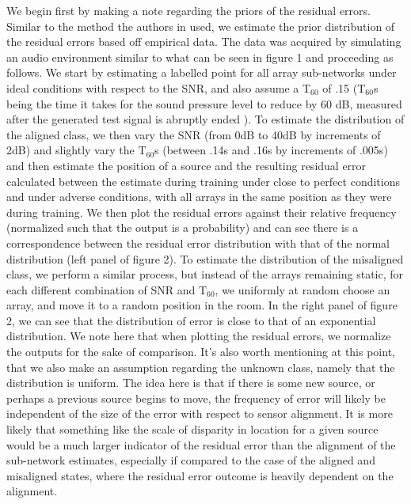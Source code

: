 \documentclass{article}
\begin{document}
We begin first by making a note regarding the priors of the residual errors. Similar to the method the authors in \cite{NA_misalignmentRecMRFsFcn} used, we estimate the prior distribution of the residual errors based off empirical data. The data was acquired by simulating an audio environment similar to what can be seen in figure 1 and proceeding as follows. We start by estimating a labelled point for all array sub-networks under ideal conditions with respect to the SNR, and also assume a T$_{60}$ of .15 (T$_{60}$s being the time it takes for the sound pressure level to reduce by 60 dB, measured after the generated test signal is abruptly ended  \cite{JS_mathDftAudioApps}). To estimate the distribution of the aligned class, we then vary the SNR (from 0dB to 40dB by increments of 2dB) and slightly vary the T$_{60}$s (between .14s and .16s by increments of .005s) and then estimate the position of a source and the resulting residual error calculated between the estimate during training under close to perfect conditions and under adverse conditions, with all arrays in the same position as they were during training. We then plot the residual errors against their relative frequency (normalized such that the output is a probability) and can see there is a correspondence between the residual error distribution with that of the normal distribution (left panel of figure 2). To estimate the distribution of the misaligned class, we perform a similar process, but instead of the arrays remaining static, for each different combination of SNR and T$_{60}$, we uniformly at random choose an array, and move it to a random position in the room. In the right panel of figure 2, we can see that the distribution of error is close to that of an exponential distribution. We note here that when plotting the residual errors, we normalize the outputs for the sake of comparison. It's also worth mentioning at this point, that we also make an assumption regarding the unknown class, namely that the distribution is uniform. The idea here is that if there is some new source, or perhaps a previous source begins to move, the frequency of error will likely be independent of the size of the error with respect to sensor alignment. It is more likely that something like the scale of disparity in location for a given source would be a much larger indicator of the residual error than the alignment of the sub-network estimates, especially if compared to the case of the aligned and misaligned states, where the residual error outcome is heavily dependent on the alignment. 
\end{document}
